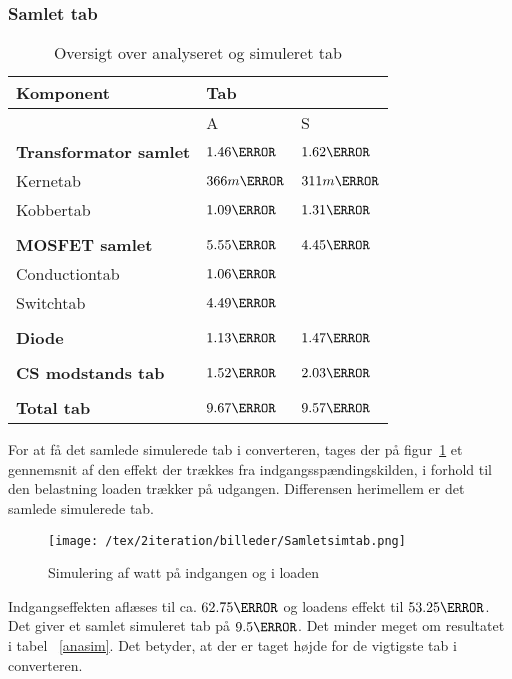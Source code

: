 \subsubsection{Samlet tab}
\begin{table}[H] 			
	\centering
	\begin{tabularx}{\textwidth}{|X|l|l|}
		\hline
		\textbf{\large Komponent} & \multicolumn{2}{|l|}{\textbf{\large Tab}} \\ \hline
		& A & S	\\ \hline
		\textbf{Transformator samlet} & $1.46\watt$ & $1.62\watt$ \\ \hline 
		Kernetab & $366m\watt$ & $311m\watt$ \\ \hline
		Kobbertab & $1.09\watt$ & $1.31\watt$ \\ \hline
		& &	\\ \hline
		\textbf{MOSFET samlet} & $5.55\watt$ & $4.45\watt$ \\ \hline
		Conductiontab & $1.06\watt$ & \\ \hline
		Switchtab & $4.49\watt$ & \\ \hline
		& &	\\ \hline
		\textbf{Diode} & $1.13\watt$ & $1.47\watt$ \\ \hline
		& &	\\ \hline
		\textbf{CS modstands tab} & $1.52\watt$ & $2.03\watt$ \\ \hline
		& &	\\ \hline
		\textbf{Total tab} & $9.67\watt$ & $9.57\watt$ \\ \hline
	\end{tabularx}
	\caption{Oversigt over analyseret og simuleret tab}
	\label{tab:anasim}
\end{table}

For at få det samlede simulerede tab i converteren, tages der på figur~\ref{fig: samletsimtab} et gennemsnit af den effekt der trækkes fra indgangsspændingskilden, i forhold til den belastning loaden trækker på udgangen. Differensen herimellem er det samlede simulerede tab.
\begin{figure}[H]
 	\center
 	\texttt{[image: /tex/2iteration/billeder/Samletsimtab.png]}
 	\caption{Simulering af watt på indgangen og i loaden}
 	\label{fig: samletsimtab}
\end{figure}

Indgangseffekten aflæses til ca. $62.75\watt$ og loadens effekt til $53.25\watt$. Det giver et samlet simuleret tab på $9.5\watt$. Det minder meget om resultatet i tabel ~\ref{anasim}. Det betyder, at der er taget højde for de vigtigste tab i converteren. 